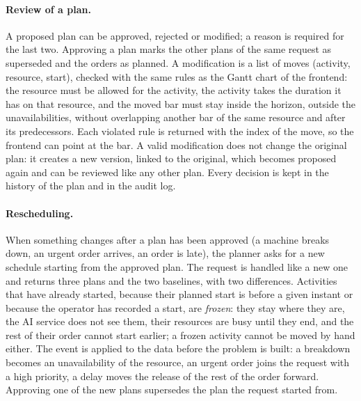 \paragraph{Review of a plan.} A proposed plan can be approved, rejected or modified; a reason is
required for the last two. Approving a plan marks the other plans of the same request as
superseded and the orders as planned. A modification is a list of moves (activity, resource,
start), checked with the same rules as the Gantt chart of the frontend: the resource must be
allowed for the activity, the activity takes the duration it has on that resource, and the moved
bar must stay inside the horizon, outside the unavailabilities, without overlapping another bar
of the same resource and after its predecessors. Each violated rule is returned with the index
of the move, so the frontend can point at the bar. A valid modification does not change the
original plan: it creates a new version, linked to the original, which becomes proposed again
and can be reviewed like any other plan. Every decision is kept in the history of the plan and
in the audit log.

\paragraph{Rescheduling.} When something changes after a plan has been approved (a machine
breaks down, an urgent order arrives, an order is late), the planner asks for a new schedule
starting from the approved plan. The request is handled like a new one and returns three plans
and the two baselines, with two differences. Activities that have already started, because
their planned start is before a given instant or because the operator has recorded a start,
are \emph{frozen}: they stay where they are, the AI service does not see them, their resources
are busy until they end, and the rest of their order cannot start earlier; a frozen activity
cannot be moved by hand either. The event is applied to the data before the problem is built:
a breakdown becomes an unavailability of the resource, an urgent order joins the request with a
high priority, a delay moves the release of the rest of the order forward. Approving one of the
new plans supersedes the plan the request started from.

